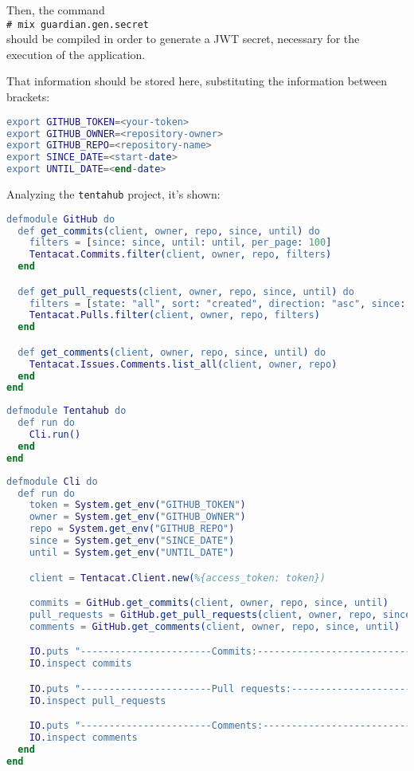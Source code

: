 Then, the command {
\newcommand{\shellcmd}[1]{\\\indent\indent\texttt{\footnotesize\# #1}\\}
  \shellcmd{mix guardian.gen.secret}
} should be compiled in order to generate a JWT secret, necessary for the execution of the application.\newline

That information should be stored here, substituting the information between brackets:

\begin{lstlisting}[language=Erlang, caption={.env.sample}]
export GITHUB_TOKEN=<your-token>
export GITHUB_OWNER=<repository-owner>
export GITHUB_REPO=<repository-name>
export SINCE_DATE=<start-date>
export UNTIL_DATE=<end-date>
\end{lstlisting}

Analyzing the \texttt{tentahub} project, it's shown:

\begin{lstlisting}[language=Erlang, caption={github.ex}]
    defmodule GitHub do
  def get_commits(client, owner, repo, since, until) do
    filters = [since: since, until: until, per_page: 100]
    Tentacat.Commits.filter(client, owner, repo, filters)
  end

  def get_pull_requests(client, owner, repo, since, until) do
    filters = [state: "all", sort: "created", direction: "asc", since: since, until: until, per_page: 100]
    Tentacat.Pulls.filter(client, owner, repo, filters)
  end

  def get_comments(client, owner, repo, since, until) do
    Tentacat.Issues.Comments.list_all(client, owner, repo)
  end
end
\end{lstlisting} 

\begin{lstlisting}[language=Erlang, caption={tentahub.ex}]
    defmodule Tentahub do
  def run do
    Cli.run()
  end
end
\end{lstlisting}


\begin{lstlisting}[language=Erlang, caption={cli.ex}]
    defmodule Cli do
  def run do
    token = System.get_env("GITHUB_TOKEN")
    owner = System.get_env("GITHUB_OWNER")
    repo = System.get_env("GITHUB_REPO")
    since = System.get_env("SINCE_DATE")
    until = System.get_env("UNTIL_DATE")

    client = Tentacat.Client.new(%{access_token: token})

    commits = GitHub.get_commits(client, owner, repo, since, until)
    pull_requests = GitHub.get_pull_requests(client, owner, repo, since, until)
    comments = GitHub.get_comments(client, owner, repo, since, until)

    IO.puts "-----------------------Commits:------------------------------"
    IO.inspect commits

    IO.puts "-----------------------Pull requests:------------------------"
    IO.inspect pull_requests

    IO.puts "-----------------------Comments:-----------------------------"
    IO.inspect comments
  end
end
\end{lstlisting}

